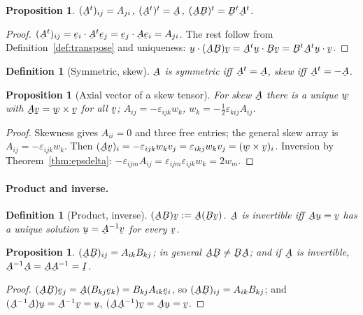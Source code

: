 \documentclass[17pt,a4paper]{extreport}
\DeclareRobustCommand{\vek}[1]{\underaccent{\tilde}{#1}}
\newcommand{\I}{\vek{I}}
\newcommand{\bu}{\vek{u}}
\newcommand{\bv}{\vek{v}}
\newcommand{\bw}{\vek{w}}
\newcommand{\be}{\vek{e}}
\newcommand{\bA}{\vek{A}}
\newcommand{\bB}{\vek{B}}
\newcommand{\eps}{\varepsilon}
\newcommand{\ip}[2]{#1\cdot#2}
\theoremstyle{scplain}
\newtheorem{proposition}[theorem]{Proposition}
\theoremstyle{scdefn}
\newtheorem{definition}[theorem]{Definition}
\theoremstyle{scplain}
\begin{document}
\begin{proposition}\label{prop:transpose}
$(\bA^{t})_{ij}=A_{ji}$, $(\bA^{t})^{t}=\bA$, $(\bA\bB)^{t}=\bB^{t}\bA^{t}$.
\end{proposition}

\begin{proof}
$(\bA^{t})_{ij}=\ip{\be_{i}}{\bA^{t}\be_{j}}=\ip{\be_{j}}{\bA\be_{i}}
=A_{ji}$. The rest follow from Definition~\ref{def:transpose} and
uniqueness: $\ip\bu{(\bA\bB)\bv}=\ip{\bA^{t}\bu}{\bB\bv}
=\ip{\bB^{t}\bA^{t}\bu}\bv$.
\end{proof}

\begin{definition}[Symmetric, skew]\label{def:symskew}
$\bA$ is symmetric iff $\bA^{t}=\bA$, skew iff $\bA^{t}=-\bA$.
\end{definition}

\begin{proposition}[Axial vector of a skew tensor]\label{prop:axial}
For skew $\bA$ there is a unique $\bw$ with $\bA\bv=\bw\times\bv$ for all
$\bv$; $A_{ij}=-\eps_{ijk}w_{k}$, $w_{k}=-\tfrac12\eps_{kij}A_{ij}$.
\end{proposition}

\begin{proof}
Skewness gives $A_{ii}=0$ and three free entries; the general skew array is
$A_{ij}=-\eps_{ijk}w_{k}$. Then
$(\bA\bv)_{i}=-\eps_{ijk}w_{k}v_{j}=\eps_{ikj}w_{k}v_{j}
=(\bw\times\bv)_{i}$. Inversion by Theorem~\ref{thm:epsdelta}:
$-\eps_{ijm}A_{ij}=\eps_{ijm}\eps_{ijk}w_{k}=2w_{m}$.
\end{proof}

\paragraph*{Product and inverse.}

\begin{definition}[Product, inverse]\label{def:prodinv}
$(\bA\bB)\bv:=\bA(\bB\bv)$. $\bA$ is invertible iff $\bA\bu=\bv$ has a
unique solution $\bu=\bA^{-1}\bv$ for every $\bv$.
\end{definition}

\begin{proposition}\label{prop:prodinv}
$(\bA\bB)_{ij}=A_{ik}B_{kj}$; in general $\bA\bB\neq\bB\bA$; and if $\bA$ is
invertible, $\bA^{-1}\bA=\bA\bA^{-1}=\I$.
\end{proposition}

\begin{proof}
$(\bA\bB)\be_{j}=\bA(B_{kj}\be_{k})=B_{kj}A_{ik}\be_{i}$, so
$(\bA\bB)_{ij}=A_{ik}B_{kj}$; and
$(\bA^{-1}\bA)\bu=\bA^{-1}\bv=\bu$, $(\bA\bA^{-1})\bv=\bA\bu=\bv$.
\end{proof}
\end{document}
